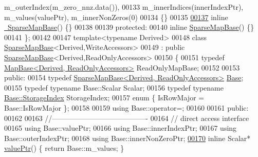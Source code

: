 \begin{DoxyCode}
      m\_outerIndex(m\_zero\_nnz.data()),
00133         m\_innerIndices(innerIndexPtr), m\_values(valuePtr), m\_innerNonZeros(0)
00134     \{\}
00135 
\hyperlink{group___sparse_core___module_ab375aedf824909a7f1a6af24ee60d70f}{00137}     \textcolor{keyword}{inline} \hyperlink{group___sparse_core___module_ab375aedf824909a7f1a6af24ee60d70f}{~SparseMapBase}() \{\}
00138 
00139   \textcolor{keyword}{protected}:
00140     \textcolor{keyword}{inline} \hyperlink{class_eigen_1_1_sparse_map_base}{SparseMapBase}() \{\}
00141 \};
00142 
00147 \textcolor{keyword}{template}<\textcolor{keyword}{typename} Derived>
00148 \textcolor{keyword}{class }\hyperlink{class_eigen_1_1_sparse_map_base}{SparseMapBase}<Derived,WriteAccessors>
00149   : \textcolor{keyword}{public} \hyperlink{class_eigen_1_1_sparse_map_base}{SparseMapBase}<Derived,ReadOnlyAccessors>
00150 \{
00151     \textcolor{keyword}{typedef} \hyperlink{group___core___module_class_eigen_1_1_map_base_3_01_derived_00_01_read_only_accessors_01_4}{MapBase<Derived, ReadOnlyAccessors>} ReadOnlyMapBase;
00152     
00153   \textcolor{keyword}{public}:
00154     \textcolor{keyword}{typedef} \hyperlink{group___sparse_core___module_class_eigen_1_1_sparse_map_base_3_01_derived_00_01_read_only_accessors_01_4}{SparseMapBase<Derived, ReadOnlyAccessors>} 
      \hyperlink{group___sparse_core___module_class_eigen_1_1_sparse_matrix_base}{Base};
00155     \textcolor{keyword}{typedef} \textcolor{keyword}{typename} Base::Scalar Scalar;
00156     \textcolor{keyword}{typedef} \textcolor{keyword}{typename} \hyperlink{group___sparse_core___module_a0b540ba724726ebe953f8c0df06081ed}{Base::StorageIndex} StorageIndex;
00157     \textcolor{keyword}{enum} \{ IsRowMajor = Base::IsRowMajor \};
00158     
00159     \textcolor{keyword}{using} Base::operator=;
00160 
00161   \textcolor{keyword}{public}:
00162     
00163     \textcolor{comment}{//----------------------------------------}
00164     \textcolor{comment}{// direct access interface}
00165     \textcolor{keyword}{using} Base::valuePtr;
00166     \textcolor{keyword}{using} Base::innerIndexPtr;
00167     \textcolor{keyword}{using} Base::outerIndexPtr;
00168     \textcolor{keyword}{using} Base::innerNonZeroPtr;
\hyperlink{group___sparse_core___module_af91648a18729ae8ff29cb1d8751c5655}{00170}     \textcolor{keyword}{inline} Scalar* \hyperlink{group___sparse_core___module_af91648a18729ae8ff29cb1d8751c5655}{valuePtr}()              \{ \textcolor{keywordflow}{return} Base::m\_values; \}

\end{DoxyCode}
